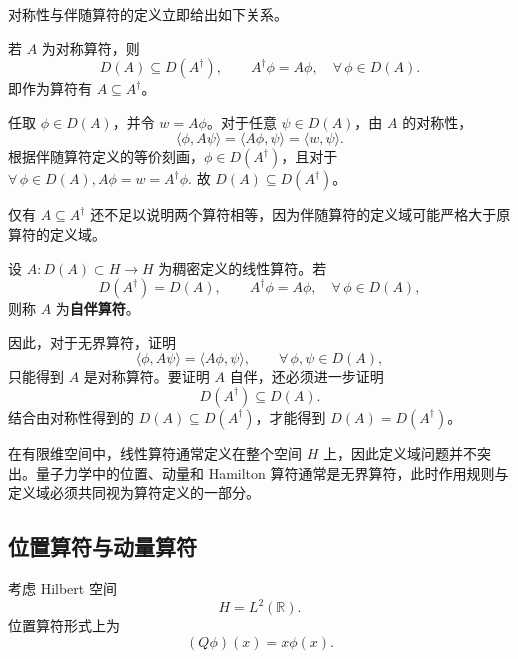 \documentclass[UTF8,a4paper,11pt,openany]{ctexbook}
\begin{document}
对称性与伴随算符的定义立即给出如下关系。

\begin{proposition}
若 $A$ 为对称算符，则
\begin{equation}
    D(A)\subseteq D(A^\dagger),
    \qquad
    A^\dagger\phi=A\phi,
    \quad
    \forall\,\phi\in D(A).
\end{equation}
即作为算符有 $A\subseteq A^\dagger$。
\end{proposition}

\begin{proofblock}
任取 $\phi\in D(A)$，并令 $w=A\phi$。对于任意 $\psi\in D(A)$，由 $A$ 的对称性，
\[
\langle \phi,A\psi\rangle
=
\langle A\phi,\psi\rangle
=
\langle w,\psi\rangle.
\]
根据伴随算符定义的等价刻画，$\phi\in D(A^\dagger)$，且对于
$
\forall\,\phi\in D(A), A\phi=w=A^\dagger\phi.
$
故 $D(A)\subseteq D(A^\dagger)$。
\end{proofblock}

仅有 $A\subseteq A^\dagger$ 还不足以说明两个算符相等，因为伴随算符的定义域可能严格大于原算符的定义域。

\begin{definition}[自伴算符]
设 $A:D(A)\subset H\to H$ 为稠密定义的线性算符。若
\begin{equation}
    D(A^\dagger)=D(A),
    \qquad
    A^\dagger\phi=A\phi,
    \quad
    \forall\,\phi\in D(A),
\end{equation}
则称 $A$ 为\textbf{自伴算符}。
\end{definition}

因此，对于无界算符，证明
\[
\langle \phi,A\psi\rangle
=
\langle A\phi,\psi\rangle,
\qquad
\forall\,\phi,\psi\in D(A),
\]
只能得到 $A$ 是对称算符。要证明 $A$ 自伴，还必须进一步证明
\[
D(A^\dagger)\subseteq D(A).
\]
结合由对称性得到的 $D(A)\subseteq D(A^\dagger)$，才能得到 $D(A)=D(A^\dagger)$。

在有限维空间中，线性算符通常定义在整个空间 $H$ 上，因此定义域问题并不突出。量子力学中的位置、动量和 Hamilton 算符通常是无界算符，此时作用规则与定义域必须共同视为算符定义的一部分。

\subsection{位置算符与动量算符}

考虑 Hilbert 空间
\[
H=L^2(\mathbb R).
\]
位置算符形式上为
\[
(Q\phi)(x)=x\phi(x).
\]
\end{document}
